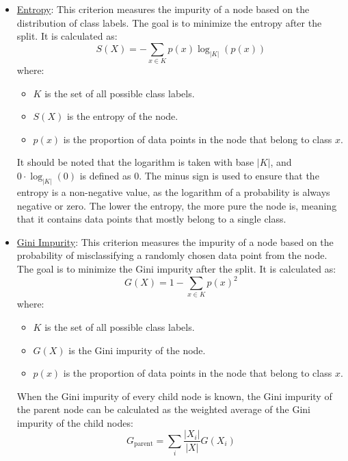 \begin{itemize}
    \item \ul{Entropy}: This criterion measures the impurity of a node based on the distribution of class labels. The goal is to minimize the entropy after the split. It is calculated as:
    \begin{equation*}
        S(X) = -\sum_{x\in K} p(x) \log_{|K|} (p(x))
    \end{equation*}
    where:
    \begin{itemize}
        \item $K$ is the set of all possible class labels.
        \item $S(X)$ is the entropy of the node.
        \item $p(x)$ is the proportion of data points in the node that belong to class $x$.
    \end{itemize}

    It should be noted that the logarithm is taken with base $|K|$, and $0\cdot \log_{|K|}(0)$ is defined as $0$. The minus sign is used to ensure that the entropy is a non-negative value, as the logarithm of a probability is always negative or zero. The lower the entropy, the more pure the node is, meaning that it contains data points that mostly belong to a single class.

    \item \ul{Gini Impurity}: This criterion measures the impurity of a node based on the probability of misclassifying a randomly chosen data point from the node. The goal is to minimize the Gini impurity after the split. It is calculated as:
    \begin{equation*}
        G(X) = 1 - \sum_{x\in K} p(x)^2
    \end{equation*}
    where:
    \begin{itemize}
        \item $K$ is the set of all possible class labels.
        \item $G(X)$ is the Gini impurity of the node.
        \item $p(x)$ is the proportion of data points in the node that belong to class $x$.
    \end{itemize}

    When the Gini impurity of every child node is known, the Gini impurity of the parent node can be calculated as the weighted average of the Gini impurity of the child nodes:
    \begin{equation*}
    G_{\text{parent}} = \sum_{i} \frac{|X_i|}{|X|} G(X_i)
    \end{equation*}
\end{itemize}

